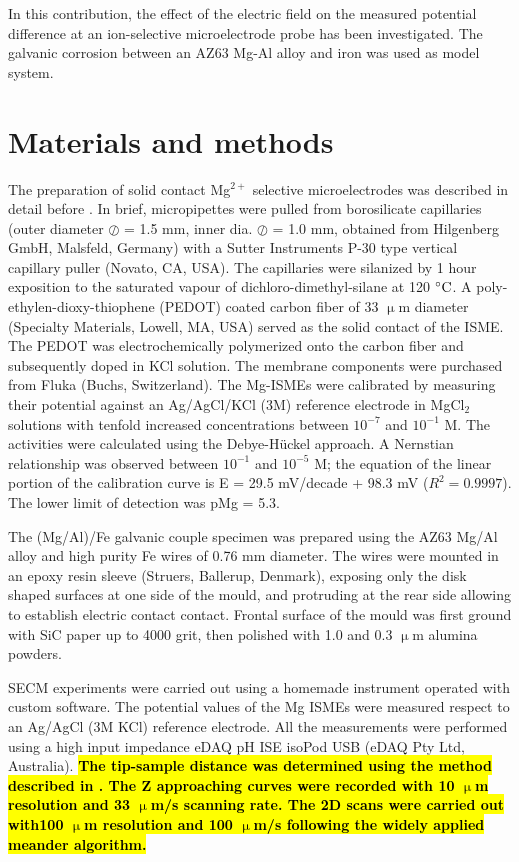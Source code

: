 \documentclass[3p]{elsarticle}
\begin{document}
In this contribution, the effect of the electric field on the measured potential difference at an ion-selective microelectrode probe has been investigated. The galvanic corrosion between an AZ63 Mg-Al alloy and iron was used as model system.

\section{Materials and methods}

The preparation of solid contact Mg$^{2+}$ selective microelectrodes was described in detail before \cite{overmg3}. In brief, micropipettes were pulled from borosilicate capillaries (outer diameter $\oslash$ = 1.5 mm, inner dia. $\oslash$ = 1.0 mm, obtained from Hilgenberg GmbH, Malsfeld, Germany) with a Sutter Instruments P-30 type vertical capillary puller (Novato, CA, USA). The capillaries were silanized by 1 hour exposition to the saturated vapour of dichloro-dimethyl-silane at 120 $\celsius$. A poly-ethylen-dioxy-thiophene (PEDOT) coated carbon fiber of 33 $\upmu$m diameter (Specialty Materials, Lowell, MA, USA) served as the solid contact of the ISME. The PEDOT was electrochemically polymerized onto the carbon fiber and subsequently doped in KCl solution. The membrane components were purchased from Fluka (Buchs, Switzerland).
The Mg-ISMEs were calibrated by measuring their potential against an Ag/AgCl/KCl (3M) reference electrode in MgCl$_2$ solutions with tenfold increased concentrations between $10^{-7}$ and $10^{-1}$ M. The activities were calculated using the Debye-Hückel approach. A Nernstian relationship was observed between $10^{-1}$ and $10^{-5}$ M; the equation of the linear portion of the calibration curve is E = 29.5 mV/decade + 98.3 mV ($R^2=0.9997$). The lower limit of detection was pMg = 5.3.

The (Mg/Al)/Fe galvanic couple specimen was prepared using the AZ63 Mg/Al alloy and high purity Fe wires of 0.76 mm diameter. The wires were mounted in an epoxy resin sleeve (Struers, Ballerup, Denmark), exposing only the disk shaped surfaces at one side of the mould, and protruding at the rear side allowing to establish electric contact contact. Frontal surface of the mould was first ground with SiC paper up to 4000 grit, then polished with 1.0 and 0.3 $\upmu$m alumina powders.

SECM experiments were carried out using a homemade instrument operated with custom software. The potential values of the Mg ISMEs were measured respect to an Ag/AgCl (3M KCl) reference electrode. All the measurements were performed using a high input impedance eDAQ pH ISE isoPod USB (eDAQ Pty Ltd, Australia). \hl{\textbf{The tip-sample distance was determined using the method described in \cite{overmg3}. The Z approaching curves were recorded with 10 $\upmu$m resolution and 33 $\upmu$m/s scanning rate. The 2D scans were carried out with100 $\upmu$m resolution and 100 $\upmu$m/s following the widely applied meander algorithm.}}
\end{document}
